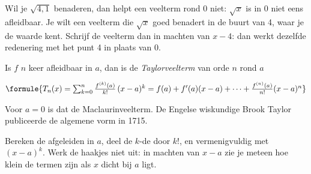 Wil je $\sqrt{4{,}1}$ benaderen, dan helpt een veelterm rond 0 niet: $\sqrt x$ is in 0 niet eens afleidbaar. Je wilt een veelterm die $\sqrt x$ goed benadert in de buurt van 4, waar je de waarde kent. Schrijf de veelterm dan in machten van $x - 4$: dan werkt dezelfde redenering met het punt 4 in plaats van 0.

\begin{theorie}
Is $f$ $n$ keer afleidbaar in $a$, dan is de \emph{Taylorveelterm} van orde $n$ rond $a$

\vspace{1mm}
\qquad $\formule{T_n(x) = \sum_{k=0}^{n} \frac{f^{(k)}(a)}{k!}\,(x - a)^k = f(a) + f'(a)(x - a) + \cdots + \frac{f^{(n)}(a)}{n!}(x - a)^n}$
\end{theorie}

Voor $a = 0$ is dat de Maclaurinveelterm. De Engelse wiskundige Brook Taylor publiceerde de algemene vorm in 1715.


\begin{werkwijze}
Bereken de afgeleiden in $a$, deel de $k$-de door $k!$, en vermenigvuldig met $(x - a)^k$. Werk de haakjes niet uit: in machten van $x - a$ zie je meteen hoe klein de termen zijn als $x$ dicht bij $a$ ligt.
\end{werkwijze}


